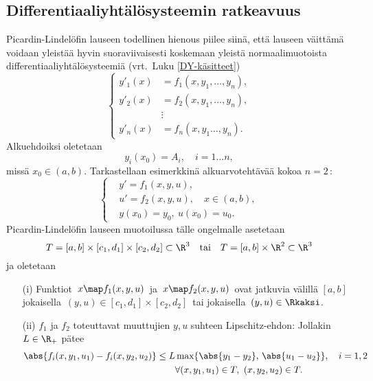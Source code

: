 \pagebreak
\subsection{Differentiaaliyhtälösysteemin ratkeavuus}

Picardin-Lindelöfin lauseen todellinen hienous piilee siinä, että lauseen väittämä voidaan
yleistää hyvin suoraviivaisesti koskemaan yleistä normaalimuotoista 
differentiaaliyhtälösysteemiä (vrt.\ Luku \ref{DY-käsitteet})
\[ \left\{ \begin{aligned} 
           y'_1(x) &= f_1(x,y_1, \ldots, y_n), \\
           y'_2(x) &= f_2(x,y_1, \ldots, y_n), \\
                  &\vdots \\
           y'_n(x) &= f_n(x,y_1 \ldots, y_n).
           \end{aligned} \right. \]
Alkuehdoiksi oletetaan
\[ 
y_i(x_0) = A_i, \quad i = 1 \ldots n, 
\]
missä $x_0\in(a,b)$. Tarkastellaan esimerkkinä alkuarvotehtävää kokoa $n=2\,$:
\begin{equation} \label{Picard-4}
\left\{ \begin{aligned}
&y' = f_1(x,y,u), \\
&u' = f_2(x,y,u), \quad x\in(a,b), \\
&y(x_0)=y_0,\ u(x_0)=u_0.
        \end{aligned} \right.
\end{equation}
Picardin-Lindelöfin lauseen muotoilussa tälle ongelmalle asetetaan 
\[
T=[a,b]\times[c_1,d_1]\times[c_2,d_2]\subset\R^3 \quad 
        \text{tai} \quad T=[a,b]\times\R^2\subset\R^3
\]
ja oletetaan
\begin{itemize}
\item[(i)]  Funktiot $\,x \map f_1(x,y,u)\,$ ja $\,x \map f_2(x,y,u)\,$ ovat jatkuvia välillä
            $[a,b]$ jokaisella $\,(y,u)\in[c_1,d_1]\times[c_2,d_2]\,$ tai jokaisella
            $\,(y,u)\in\Rkaksi$.
\item[(ii)] $f_1$ ja $f_2$ toteuttavat muuttujien $y,u$ suhteen Lipschitz-ehdon: \newline
            Jollakin $L\in\R_+$ pätee
            \begin{align*}
            \abs{f_i(x,y_1,u_1)-f_i(x,y_2,u_2)} 
                     &\le L\max\{\abs{y_1-y_2},\,\abs{u_1-u_2}\}, \quad i=1,2 \\
                     &\qquad\forall (x,y_1,u_1)\in T, \ (x,y_2,u_2)\in T.
            \end{align*}
\end{itemize}
